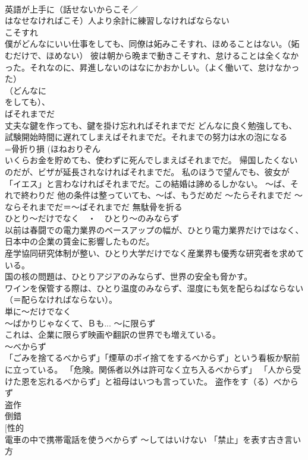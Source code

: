 \documentclass[8pt]{extreport}
\begin{document}
\begin{CJK}{UTF8}{min}
\\	英語が上手に（話せないからこそ／
\\	はなせなければこそ）人より余計に練習しなければならない	
\\	こそすれ 
\\	僕がどんなにいい仕事をしても、同僚は妬みこそすれ、ほめることはない。（妬むだけで、ほめない） 彼は朝から晩まで動きこそすれ、怠けることは全くなかった。それなのに、昇進しないのはなにかおかしい。（よく働いて、怠けなかった）
\\	（どんなに
\\	をしても）、
\\	ばそれまでだ　
\\	丈夫な鍵を作っても、鍵を掛け忘れればそれまでだ どんなに良く勉強しても、試験開始時間に遅れてしまえばそれまでだ。それまでの努力は水の泡になる
\\	=骨折り損 (ほねおりぞん 
\\	いくらお金を貯めても、使わずに死んでしまえばそれまでだ。 帰国したくないのだが、ビザが延長されなければそれまでだ。 私のほうで望んでも、彼女が「イエス」と言わなければそれまでだ。この結婚は諦めるしかない。	～ば、それで終わりだ 他の条件は整っていても、～ば、もうだめだ	～たらそれまでだ ～ならそれまでだ＝～ばそれまでだ 無駄骨を折る 
\\	ひとり～だけでなく　・　ひとり～のみならず	
\\	以前は春闘での電力業界のベースアップの幅が、ひとり電力業界だけではなく、日本中の企業の賃金に影響したものだ。
\\	産学協同研究体制が整い、ひとり大学だけでなく産業界も優秀な研究者を求めている。
\\	国の核の問題は、ひとりアジアのみならず、世界の安全も脅かす。
\\	ワインを保管する際は、ひとり温度のみならず、湿度にも気を配らねばならない（＝配らなければならない）。
\\	単に～だけでなく 
\\	～ばかりじゃなくて、Ｂも... ～に限らず 
\\	これは、企業に限らず映画や翻訳の世界でも増えている。
\\	～べからず	
\\	「ごみを捨てるべからず」「煙草のポイ捨てをするべからず」という看板か駅前に立っている。 「危険。関係者以外は許可なく立ち入るべからず」 「人から受けた恩を忘れるべからず」と祖母はいつも言っていた。 盗作をす（る）べからず 
\\	盗作 
\\	倒錯 
\\	[性的
\\	電車の中で携帯電話を使うべからず	～してはいけない 「禁止」を表す古き言い方 

\end{CJK}
\end{document}

